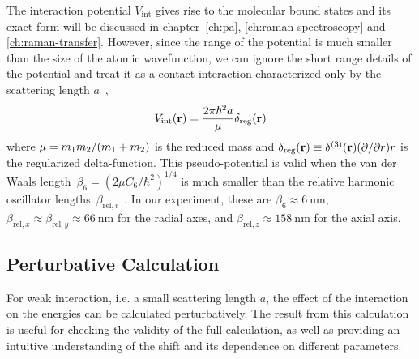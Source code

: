 The interaction potential $V_{\mathrm{int}}$ gives rise to
the molecular bound states and its exact form will be discussed in chapter~\ref{ch:pa},
\ref{ch:raman-spectroscopy} and \ref{ch:raman-transfer}.
However, since the range of the potential is much smaller than
the size of the atomic wavefunction, we can ignore the short range details of the potential
and treat it as a contact interaction characterized only by
the scattering length $a$~\cite{busch_two_1998},
\[
  V_{\mathrm{int}}{\left({\mathbf{r}}\right)}=\frac{2\pi\hbar^2a}{\mu}\delta_{\mathrm{reg}}{\left({\mathbf{r}}\right)}
\]
where $\mu = m_1m_2/{\left({m_1+m_2}\right)}$ is the reduced mass and
$\delta_{\mathrm{reg}}{\left({\mathbf{r}}\right)}\equiv\delta^{(3)}{\left({\mathbf{r}}\right)}{\left({\partial/\partial r}\right)}r$
is the regularized delta-function. This pseudo-potential is valid
when the van der Waals length~$\beta_6 = (2\mu C_6 / \hbar^2)^{1/4}$
is much smaller than the relative harmonic oscillator lengths~$\beta_{\mathrm{rel},i}$~\cite{
  bolda_effective-scattering-length_2002,blume_fermi_2002}.
In our experiment, these are $\beta_6 \approx 6~\mathrm{nm}$,
$\beta_{\mathrm{rel},x} \approx \beta_{\mathrm{rel},y}\approx 66~\mathrm{nm}$ for the radial axes,
and  $\beta_{\mathrm{rel},z} \approx 158~\mathrm{nm}$ for the axial axis.

\subsection{Perturbative Calculation}
\label{ch:interaction-shift:theory:perturb}

For weak interaction, i.e. a small scattering length $a$, the effect of the interaction
on the energies can be calculated perturbatively.
The result from this calculation is useful for checking the validity of the full calculation,
as well as providing an intuitive understanding of the shift and its dependence
on different parameters.

